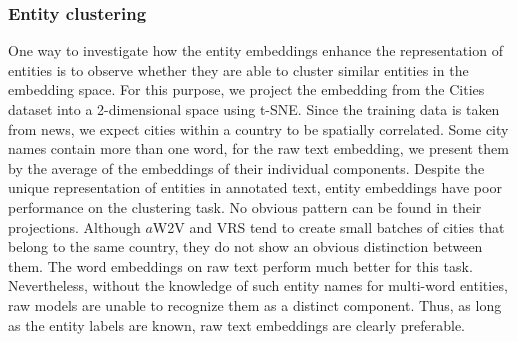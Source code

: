 \subsubsection{Entity clustering} 
One way to investigate how the entity embeddings enhance the representation of entities is to observe whether they are able to cluster similar entities in the embedding space. For this purpose, we project the embedding from the Cities dataset into a 2-dimensional space using t-SNE. Since the training data is taken from news, we expect cities within a country to be spatially correlated. Some city names contain more than one word, for the raw text embedding, we present them by the average of the embeddings of their individual components. Despite the unique representation of entities in annotated text, entity embeddings have poor performance on the clustering task. No obvious pattern can be found in their projections. Although $a$W2V and VRS tend to create small batches of cities that belong to the same country, they do not show an obvious distinction between them. The word embeddings on raw text perform much better for this task. Nevertheless, without the knowledge of such entity names for multi-word entities, raw models are unable to recognize them as a distinct component. Thus, as long as the entity labels are known, raw text embeddings are clearly preferable. 

